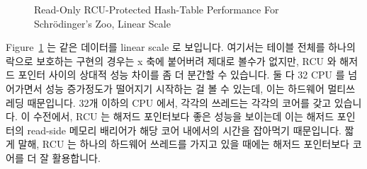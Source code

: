 \begin{figure}[tb]
\centering
{}
\caption{Read-Only RCU-Protected Hash-Table Performance For Schr\"odinger's Zoo, Linear Scale}
\label{fig:datastruct:Read-Only RCU-Protected Hash-Table Performance For Schroedinger's Zoo, Linear Scale}
\end{figure}

Figure~\ref{fig:datastruct:Read-Only RCU-Protected Hash-Table Performance For Schroedinger's Zoo, Linear Scale}
는 같은 데이터를 linear scale 로 보입니다.
여기서는 테이블 전체를 하나의 락으로 보호하는 구현의 경우는 x 축에 붙어버려
제대로 볼수가 없지만, RCU 와 해저드 포인터 사이의 상대적 성능 차이를 좀 더
분간할 수 있습니다.
둘 다 32 CPU 를 넘어가면서 성능 증가정도가 떨어지기 시작하는 걸 볼 수 있는데,
이는 하드웨어 멀티쓰레딩 때문입니다.
32개 이하의 CPU 에서, 각각의 쓰레드는 각각의 코어를 갖고 있습니다.
이 수전에서, RCU 는 해저드 포인터보다 좋은 성능을 보이는데 이는 해저드 포인터의
read-side 메모리 배리어가 해당 코어 내에서의 시간을 잡아먹기 때문입니다.
짧게 말해, RCU 는 하나의 하드웨어 쓰레드를 가지고 있을 때에는 해저드 포인터보다
코어를 더 잘 활용합니다.

